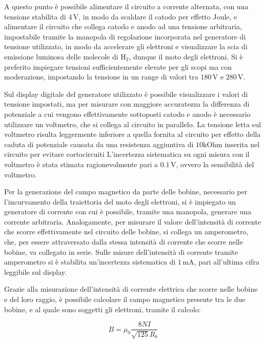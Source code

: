 \documentclass[a4paper,12pt]{article}
\begin{document}
A questo punto è possibile alimentare il circuito a corrente alternata, con una tensione stabilita di \( 4 \, \text{V} \), in modo da scaldare il catodo per effetto Joule, e alimentare il circuito che collega catodo e anodo ad una tensione arbitraria, impostabile tramite la manopola di regolazione incorporata nel generatore di tensione utilizzato, in modo da accelerare gli elettroni e visualizzare la scia di emissione luminosa delle molecole di \( \text{H}_2 \), dunque il moto degli elettroni. Si è preferito impiegare tensioni sufficientemente elevate per gli scopi ma con moderazione, impostando la tensione in un range di valori tra \( 180 \, \text{V} \) e \( 280 \, \text{V} \).

Sul display digitale del generatore utilizzato è possibile visualizzare i valori di tensione impostati, ma per misurare con maggiore accuratezza la differenza di potenziale a cui vengono effettivamente sottoposti catodo e anodo è necessario utilizzare un voltmetro, che si collega al circuito in parallelo. La tensione letta sul voltmetro risulta leggermente inferiore a quella fornita al circuito per effetto della caduta di potenziale causata da una resistenza aggiuntiva di \(10 \text{kOhm}\) inserita nel circuito per evitare cortocircuiti L’incertezza sistematica su ogni misura con il voltmetro è stata stimata ragionevolmente pari a \( 0.1 \, \text{V} \), ovvero la sensibilità del voltmetro.

Per la generazione del campo magnetico da parte delle bobine, necessario per l’incurvamento della traiettoria del moto degli elettroni, si è impiegato un generatore di corrente con cui è possibile, tramite una manopola, generare una corrente arbitraria. Analogamente, per misurare il valore dell’intensità di corrente che scorre effettivamente nel circuito delle bobine, si collega un amperometro, che, per essere attraversato dalla stessa intensità di corrente che scorre nelle bobine, va collegato in serie. Sulle misure dell’intensità di corrente tramite amperometro si è stabilita un’incertezza sistematica di \( 1 \, \text{mA} \), pari all'ultima cifra leggibile sul display.

Grazie alla misurazione dell’intensità di corrente elettrica che scorre nelle bobine e del loro raggio, è possibile calcolare il campo magnetico presente tra le due bobine, e al quale sono soggetti gli elettroni, tramite il calcolo:

\begin{equation}
    B = \mu_0 \frac{8 N I}{\sqrt{125} R_b}
    \label{eq:campo_magnetico_bobine}
\end{equation}
\end{document}
